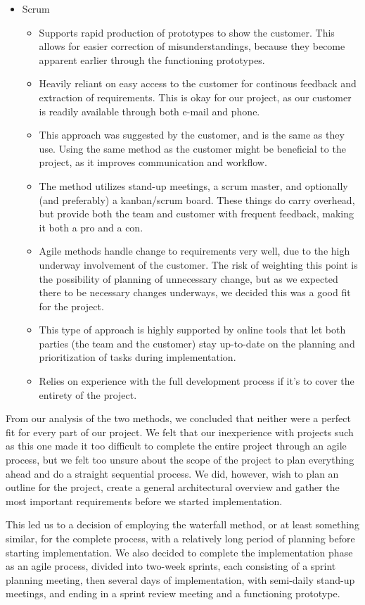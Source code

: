 \begin{itemize}
	\item Scrum
	\begin{itemize}
		\item Supports rapid production of prototypes to show the customer. This allows for easier correction of misunderstandings, because they become apparent earlier through the functioning prototypes.
		\item Heavily reliant on easy access to the customer for continous feedback and extraction of requirements. This is okay for our project, as our customer is readily available through both e-mail and phone. %
		\item This approach was suggested by the customer, and is the same as they use. Using the same method as the customer might be beneficial to the project, as it improves communication and workflow.
		\item The method utilizes stand-up meetings, a scrum master, and optionally (and preferably) a kanban/scrum board. These things do carry overhead, but provide both the team and customer with frequent feedback, making it both a pro and a con.
		\item Agile methods handle change to requirements very well, due to the high underway involvement of the customer. The risk of weighting this point is the possibility of planning of unnecessary change, but as we expected there to be necessary changes underways, we decided this was a good fit for the project.
		\item This type of approach is highly supported by online tools that let both parties (the team and the customer) stay up-to-date on the planning and prioritization of tasks during implementation.
		\item Relies on experience with the full development process if it’s to cover the entirety of the project.
	\end{itemize}
\end{itemize}
From our analysis of the two methods, we concluded that neither were a perfect fit for every part of our project. We felt that our inexperience with projects such as this one made it too difficult to complete the entire project through an agile process, but we felt too unsure about the scope of the project to plan everything ahead and do a straight sequential process. We did, however, wish to plan an outline for the project, create a general architectural overview and gather the most important requirements before we started implementation.

This led us to a decision of employing the waterfall method, or at least something similar, for the complete process, with a relatively long period of planning before starting implementation. We also decided to complete the implementation phase as an agile process, divided into two-week sprints, each consisting of a sprint planning meeting, then several days of implementation, with semi-daily stand-up meetings, and ending in a sprint review meeting and a functioning prototype.